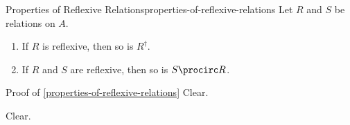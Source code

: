 \begin{proposition}{Properties of Reflexive Relations}{properties-of-reflexive-relations}%
    Let $R$ and $S$ be relations on $A$.
    \begin{enumerate}
        \item\label{properties-of-reflexive-relations-interaction-with-inverses}If $R$ is reflexive, then so is $R^{\dagger}$.
        \item\label{properties-of-reflexive-relations-interaction-with-composition}If $R$ and $S$ are reflexive, then so is $S\procirc R$.
    \end{enumerate}
\end{proposition}
\begin{Proof}{Proof of \cref{properties-of-reflexive-relations}}%
    Clear.

    Clear.
\end{Proof}
